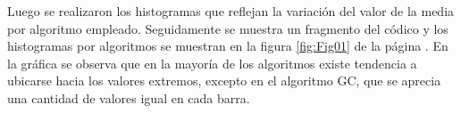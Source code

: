 \documentclass{article}
\begin{document}


Luego se realizaron los histogramas que reflejan la variación del valor de la media por algoritmo empleado. Seguidamente se muestra un fragmento del códico y los histogramas por algoritmos se muestran en la figura \ref{fig:Fig01} de la página \pageref{fig:Fig01}. En la gráfica se observa que en la mayoría de los algoritmos existe tendencia a ubicarse hacia los valores extremos, excepto en el algoritmo GC, que se aprecia una cantidad de valores igual en cada barra.





\begin{figure}[htbp]


\end{figure}
\end{document}
